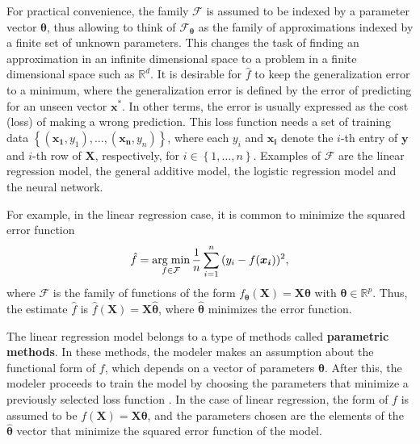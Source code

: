 For practical convenience, the family $\mathcal{F}$ is assumed to be indexed by a parameter vector $\boldsymbol{\theta}$, thus allowing to think of $\mathcal{F}_{\boldsymbol{\theta}}$ as the family of approximations indexed by a finite set of unknown parameters. This changes the task of finding an approximation in an infinite dimensional space to a problem in a finite dimensional space such as $\mathbb{R}^d$.
It is desirable for $\hat{f}$ to keep the generalization error to a minimum, where the generalization error is defined by the error of predicting for an unseen vector $\boldsymbol{x}^*$. In other terms, the error is usually expressed as the cost (loss) of making a wrong prediction. This loss function needs a set of training data $\left\{ (\boldsymbol{x_1}, y_1), ..., (\boldsymbol{x_n}, y_n) \right\}$, where each $y_i$ and $\boldsymbol{x_i}$ denote the $i$-th entry of $\boldsymbol{y}$ and $i$-th row of $\boldsymbol{X}$, respectively, for $i \in \left\{1, \ldots, n \right\}$.
Examples of $\mathcal{F}$ are the linear regression model, the general additive model, the logistic regression model and the neural network.

For example, in the linear regression case, it is common to minimize the squared error function
\begin{equation}
  \hat{f} = \operatorname*{arg\; min}_{f \in \mathcal{F}} \frac{1}{n} \sum_{i = 1}^n{ ( y_i - f(\boldsymbol{x_i}) ) ^ 2},
\end{equation}
where $\mathcal{F}$ is the family of functions of the form $f_{\boldsymbol{\theta}}(\boldsymbol{X}) = \boldsymbol{X}\boldsymbol{\theta}$ with $\boldsymbol{\theta} \in \mathbb{R}^p$. Thus, the  estimate $\hat{f}$ is $\hat{f}(\boldsymbol{X}) = \boldsymbol{X} \hat{\boldsymbol{\theta}}$, where $\hat{\boldsymbol{\theta}}$ minimizes the error function.

The linear regression model belongs to a type of methods called \textbf{parametric methods}. In these methods, the modeler makes an assumption about the functional form of $f$, which depends on a vector of parameters $\boldsymbol{\theta}$. After this, the modeler proceeds to train the model by choosing the parameters that minimize a previously selected loss function \cite[p.~21]{james2013introduction}. In the case of linear regression, the form of $f$ is assumed to be $f(\boldsymbol{X}) = \boldsymbol{X}\boldsymbol{\theta}$, and the parameters chosen are the elements of the $\hat{\boldsymbol{\theta}}$ vector that minimize the squared error function of the model.

